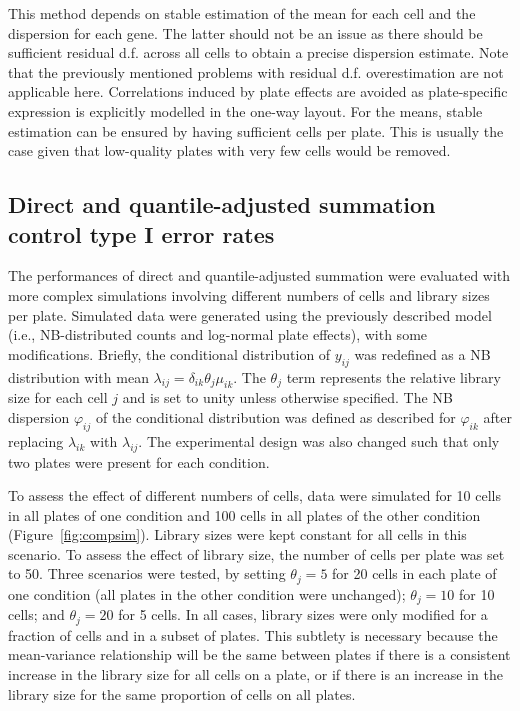\documentclass{article}
\begin{document}
This method depends on stable estimation of the mean for each cell and the dispersion for each gene.
The latter should not be an issue as there should be sufficient residual d.f. across all cells to obtain a precise dispersion estimate.
Note that the previously mentioned problems with residual d.f. overestimation are not applicable here.
Correlations induced by plate effects are avoided as plate-specific expression is explicitly modelled in the one-way layout.
For the means, stable estimation can be ensured by having sufficient cells per plate.
This is usually the case given that low-quality plates with very few cells would be removed.

\subsection{Direct and quantile-adjusted summation control type I error rates}
The performances of direct and quantile-adjusted summation were evaluated with more complex simulations involving different numbers of cells and library sizes per plate.
Simulated data were generated using the previously described model (i.e., NB-distributed counts and log-normal plate effects), with some modifications.
Briefly, the conditional distribution of $y_{ij}$ was redefined as a NB distribution with mean $\lambda_{ij} = \delta_{ik}\theta_{j}\mu_{ik}$.
The $\theta_{j}$ term represents the relative library size for each cell $j$ and is set to unity unless otherwise specified.
The NB dispersion $\varphi_{ij}$ of the conditional distribution was defined as described for $\varphi_{ik}$ after replacing $\lambda_{ik}$ with $\lambda_{ij}$.
The experimental design was also changed such that only two plates were present for each condition.

To assess the effect of different numbers of cells, data were simulated for 10 cells in all plates of one condition and 100 cells in all plates of the other condition (Figure~\ref{fig:compsim}).
Library sizes were kept constant for all cells in this scenario.
To assess the effect of library size, the number of cells per plate was set to 50.
Three scenarios were tested, by setting $\theta_j=5$ for 20 cells in each plate of one condition (all plates in the other condition were unchanged);
    $\theta_j=10$ for 10 cells; and $\theta_j=20$ for 5 cells.
In all cases, library sizes were only modified for a fraction of cells and in a subset of plates.
This subtlety is necessary because the mean-variance relationship will be the same between plates if there is a consistent increase in the library size for all cells on a plate, 
    or if there is an increase in the library size for the same proportion of cells on all plates.
\end{document}
